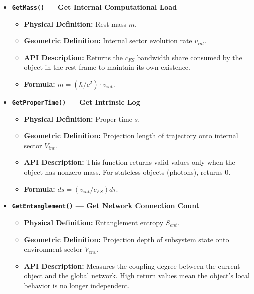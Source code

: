 \documentclass[11pt,a4paper,twoside]{book}
\begin{document}
\begin{itemize}
\item \textbf{\texttt{GetMass()} --- Get Internal Computational Load}

\begin{itemize}
\item \textbf{Physical Definition:} Rest mass $m$.

\item \textbf{Geometric Definition:} Internal sector evolution rate $v_{int}$.

\item \textbf{API Description:} Returns the $c_{FS}$ bandwidth share consumed by the object in the rest frame to maintain its own existence.

\item \textbf{Formula:} $m = (\hbar / c^2) \cdot v_{int}$.
\end{itemize}

\item \textbf{\texttt{GetProperTime()} --- Get Intrinsic Log}

\begin{itemize}
\item \textbf{Physical Definition:} Proper time $s$.

\item \textbf{Geometric Definition:} Projection length of trajectory onto internal sector $V_{int}$.

\item \textbf{API Description:} This function returns valid values only when the object has nonzero mass. For stateless objects (photons), returns 0.

\item \textbf{Formula:} $ds = (v_{int} / c_{FS}) d\tau$.
\end{itemize}

\item \textbf{\texttt{GetEntanglement()} --- Get Network Connection Count}

\begin{itemize}
\item \textbf{Physical Definition:} Entanglement entropy $S_{ent}$.

\item \textbf{Geometric Definition:} Projection depth of subsystem state onto environment sector $V_{env}$.

\item \textbf{API Description:} Measures the coupling degree between the current object and the global network. High return values mean the object's local behavior is no longer independent.
\end{itemize}
\end{itemize}
\end{document}
